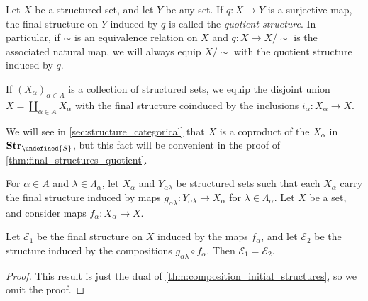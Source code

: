 \documentclass[article, a4paper, 11pt, oneside]{memoir}
\let\mathfrak\undefined
\numberwithin{equation}{chapter}
\newcommand{\calE}{\mathcal{E}}
\newcommand{\strucS}{\mathfrak{S}}
\newcommand{\ncat}[1]{\mathbf{#1}} %
\newcommand{\catStruc}[1]{\ncat{Str}_{#1}} %
\newcommand{\catStrucS}{\catStruc{\strucS}} %
\begin{document}
\begin{examplebreak}
    Let $X$ be a structured set, and let $Y$ be any set. If $q \colon X \to Y$ is a surjective map, the final structure on $Y$ induced by $q$ is called the \emph{quotient structure}. In particular, if $\sim$ is an equivalence relation on $X$ and $q \colon X \to X/{\sim}$ is the associated natural map, we will always equip $X/{\sim}$ with the quotient structure induced by $q$.
\end{examplebreak}


\begin{examplebreak}
    If $(X_\alpha)_{\alpha \in A}$ is a collection of structured sets, we equip the disjoint union $X = \coprod_{\alpha \in A} X_\alpha$ with the final structure coinduced by the inclusions $i_\alpha \colon X_\alpha \to X$.

    We will see in \cref{sec:structure_categorical} that $X$ is a coproduct of the $X_\alpha$ in $\catStrucS$, but this fact will be convenient in the proof of \cref{thm:final_structures_quotient}.
\end{examplebreak}


\begin{proposition}
    \label{thm:composition_final_structures}
    For $\alpha \in A$ and $\lambda \in \Lambda_\alpha$, let $X_\alpha$ and $Y_{\alpha\lambda}$ be structured sets such that each $X_\alpha$ carry the final structure induced by maps $g_{\alpha\lambda} \colon Y_{\alpha\lambda} \to X_\alpha$ for $\lambda \in \Lambda_\alpha$. Let $X$ be a set, and consider maps $f_\alpha \colon X_\alpha \to X$.

    Let $\calE_1$ be the final structure on $X$ induced by the maps $f_\alpha$, and let $\calE_2$ be the structure induced by the compositions $g_{\alpha\lambda} \circ f_\alpha$. Then $\calE_1 = \calE_2$.
\end{proposition}

\begin{proof}
    This result is just the dual of \cref{thm:composition_initial_structures}, so we omit the proof.
\end{proof}
\end{document}
